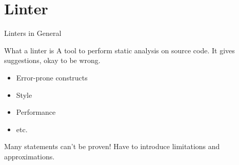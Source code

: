 \documentclass[aspectratio=169]{beamer} %
\begin{document}
%     


%     

\section{Linter}
\begin{frame}{Linters in General}
  \begin{block}{What a linter is}
    A tool to perform static analysis on source code. It gives suggestions, okay to be wrong.
    \pause
    \begin{itemize}
      \item Error-prone constructs\pause
      \item Style\pause
      \item Performance\pause
      \item etc.
    \end{itemize}
  \end{block}

  \pause
  \begin{alertblock}{Many statements can't be proven!}
    \pause Have to introduce limitations and approximations.
  \end{alertblock}
\end{frame}
\end{document}
